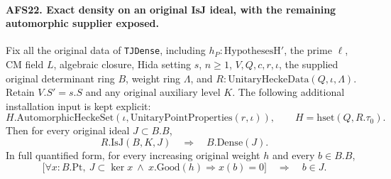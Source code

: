 \documentclass[11pt,a4paper]{article}
\numberwithin{equation}{section}
\theoremstyle{remark}\newtheorem{remark}[theorem]{Remark}
\begin{document}
\paragraph{AFS22. Exact density on an original IsJ ideal, with the remaining automorphic supplier exposed.}
\label{claim:AFS22}
Fix all the original data of \texttt{TJDense}, including
$h_P:\mathrm{HypothesesH'}$, the prime $\ell$, CM field
$L$, algebraic closure, Hida setting $s$, $n\geq1$,
$V,Q,c,r,\iota$, the supplied original determinant ring
$B$, weight ring $\Lambda$, and
$R:\mathrm{UnitaryHeckeData}(Q,\iota,\Lambda)$.
Retain $V.S'=s.S$ and any original auxiliary level $K$.
The following additional installation input is kept
explicit:
\begin{equation}\label{eq:afs-aut-input}
 H.\mathrm{AutomorphicHeckeSet}
       (\iota,\mathrm{UnitaryPointProperties}(r,\iota)),
             \qquad H=\mathrm{hset}(Q,R.\tau_0).
\end{equation}
Then for every original ideal $J\subset B.B$,
\[
            R.\mathrm{IsJ}(B,K,J)\quad\Longrightarrow\quad
                                      B.\mathrm{Dense}(J).
\]
In full quantified form, for every increasing original
weight $h$ and every $b\in B.B$,
\[
 \bigl[\forall x:B.\mathrm{Pt},\ J\subset\ker x
              \ \land\ x.\mathrm{Good}(h)\Rightarrow x(b)=0\bigr]
                                      \quad\Longrightarrow\quad b\in J.
\]
\end{document}
